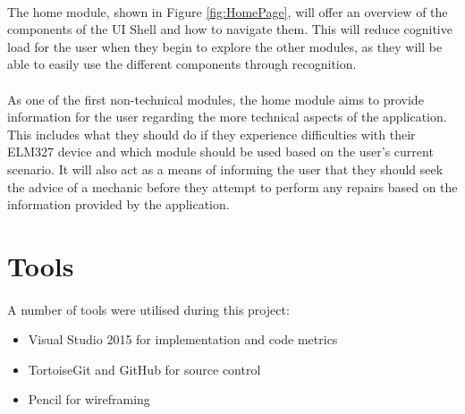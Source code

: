 		\paragraph{}{
		The home module, shown in Figure \ref{fig:HomePage}, will offer an overview of the components of the UI Shell and how to navigate them. This will reduce cognitive load for the user when they begin to explore the other modules, as they will be able to easily use the different components through recognition.
		}
		
		\paragraph{}{
		As one of the first non-technical modules, the home module aims to provide information for the user regarding the more technical aspects of the application. This includes what they should do if they experience difficulties with their ELM327 device and which module should be used based on the user's current scenario. It will also act as a means of informing the user that they should seek the advice of a mechanic before they attempt to perform any repairs based on the information provided by the application.
		}

\section{Tools}
	\paragraph{}{
	A number of tools were utilised during this project:
		\begin{itemize}
			\item Visual Studio 2015 for implementation and code metrics 
			\item TortoiseGit and GitHub for source control
			\item Pencil for wireframing
		\end{itemize}
	}
